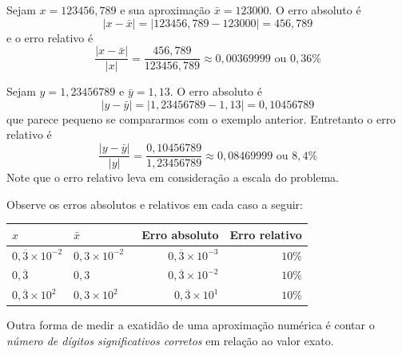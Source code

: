 \begin{ex}
Sejam $x=123456,789$ e sua aproximação $\bar{x}=123000$. O erro absoluto é
\begin{equation}
|x-\bar{x}|=|123456,789-123000|=456,789
\end{equation}
e o erro relativo é
\begin{equation}
\frac{|x-\bar{x}|}{|x|}=\frac{456,789}{123456,789}\approx 0,00369999 \text{ ou }0,36\%
\end{equation}
\end{ex}

\begin{ex}
Sejam $y=1,23456789$ e $\bar{y}=1,13$. O erro absoluto é
\begin{equation}
|y-\bar{y}|=|1,23456789-1,13|=0,10456789
\end{equation}
que parece pequeno se compararmos com o exemplo anterior. Entretanto o erro relativo é
\begin{equation}
\frac{|y-\bar{y}|}{|y|}=\frac{0,10456789}{1,23456789}\approx 0,08469999 \text{ ou }8,4\%
\end{equation}
Note que o erro relativo leva em consideração a escala do problema.
\end{ex}



\begin{ex}
Observe os erros absolutos e relativos em cada caso a seguir:
\begin{center}
  \begin{tabular}{ll|rr} \hline
    $x$ & $\bar{x}$ &\ Erro absoluto & Erro relativo\\\hline
    $0,\overline{3}\times 10^{-2}$ & $0,3\times 10^{-2}$ & $0,\overline{3}\times 10^{-3}$ & $10\%$\\
    $0,\overline{3}$              & $0,3$ & $0,\overline{3}\times 10^{-2}$ & $10\%$\\
    $0,\overline{3}\times 10^{2}$ & $0,3\times 10^{2}$ & $0,\overline{3}\times 10^{1}$ & $10\%$\\\hline
\end{tabular}
\end{center}
\end{ex}

Outra forma de medir a exatidão de uma aproximação numérica é contar o \emph{número de dígitos significativos corretos} em relação ao valor exato.

